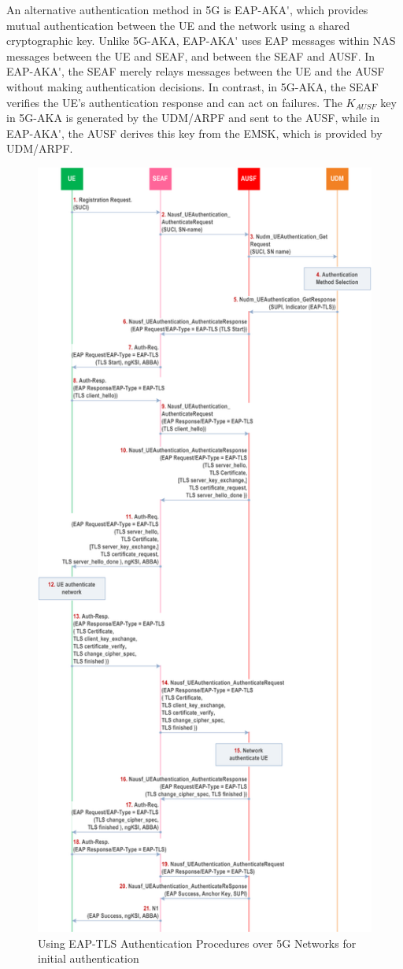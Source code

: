 An alternative authentication method in \ac{5G} is \ac{EAP-AKA'}, which provides mutual authentication between the \ac{UE} and the network using a shared cryptographic key. Unlike \ac{5G-AKA}, \ac{EAP-AKA'} uses \ac{EAP} messages within \ac{NAS} messages between the \ac{UE} and \ac{SEAF}, and between the \ac{SEAF} and \ac{AUSF}. In \ac{EAP-AKA'}, the \ac{SEAF} merely relays messages between the \ac{UE} and the \ac{AUSF} without making authentication decisions. In contrast, in \ac{5G-AKA}, the \ac{SEAF} verifies the \ac{UE}'s authentication response and can act on failures. The $K_{AUSF}$ key in \ac{5G-AKA} is generated by the \ac{UDM}/\ac{ARPF} and sent to the \ac{AUSF}, while in \ac{EAP-AKA'}, the \ac{AUSF} derives this key from the \ac{EMSK}, which is provided by \ac{UDM}/\ac{ARPF}.

\begin{figure}
    \centering
    \includegraphics[width=0.75\linewidth]{figs/Using EAP-TLS Authentication Procedures over 5G Networks for initial authentication.png}
    \caption{Using \ac{EAP-TLS} Authentication Procedures over \ac{5G} Networks for initial authentication}
    \label{fig:Using EAP-TLS Authentication Procedures over 5G Networks for initial authentication}
\end{figure}


